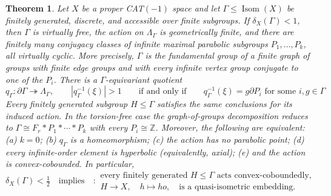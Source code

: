 \documentclass[11pt]{article}
\newtheorem{theorem}{Theorem}[section]
\theoremstyle{definition}
\newcommand{\Isom}{\operatorname{Isom}}
\begin{document}
\begin{theorem}
\label{thm:accessible-main}
Let $X$ be a proper CAT$(-1)$ space and let $\Gamma\le\Isom(X)$ be finitely generated,
discrete, and accessible over finite subgroups.  If $\delta_X(\Gamma)<1$, then $\Gamma$ is
virtually free, the action on $\Lambda_\Gamma$ is geometrically finite, and there are finitely
many conjugacy classes of infinite maximal parabolic subgroups $P_1,\dots,P_k$, all virtually
cyclic.  More precisely, $\Gamma$ is the fundamental group of a finite graph of groups with
finite edge groups and with every infinite vertex group conjugate to one of the $P_i$.  There is
a $\Gamma$-equivariant quotient
\begin{equation}\label{eq:main-accessible-quotient}
 q_\Gamma:\partial\Gamma\twoheadrightarrow\Lambda_\Gamma,
 \qquad |q_\Gamma^{-1}(\xi)|>1
 \qquad\mbox{if and only if}\qquad
 q_\Gamma^{-1}(\xi)=g\partial P_i
 \text{ for some }i, g\in\Gamma
\end{equation}
Every finitely generated subgroup $H\le\Gamma$ satisfies the same conclusions for its induced
action.  In the torsion-free case the graph-of-groups decomposition reduces to
$\Gamma\cong F_r*P_1*\cdots*P_k$ with every $P_i\cong\mathbb Z$.  Moreover, the following are equivalent: (a) $k=0$; (b) $q_\Gamma$ is a homeomorphism; (c) the
action has no parabolic point; (d) every infinite-order element is hyperbolic (equivalently, axial); (e) and the action is
convex-cobounded.  In particular,
\begin{equation}\label{eq:main-below-half-hereditary}
 \delta_X(\Gamma)<\tfrac12\quad\mbox{implies}\quad :
 \begin{gathered}
  \text{every finitely generated }H\le\Gamma\text{ acts convex-coboundedly,}\\
  H\longrightarrow X,\quad h\longmapsto ho,\quad
  \text{is a quasi-isometric embedding.}
 \end{gathered}
\end{equation}
\end{theorem}
\end{document}
